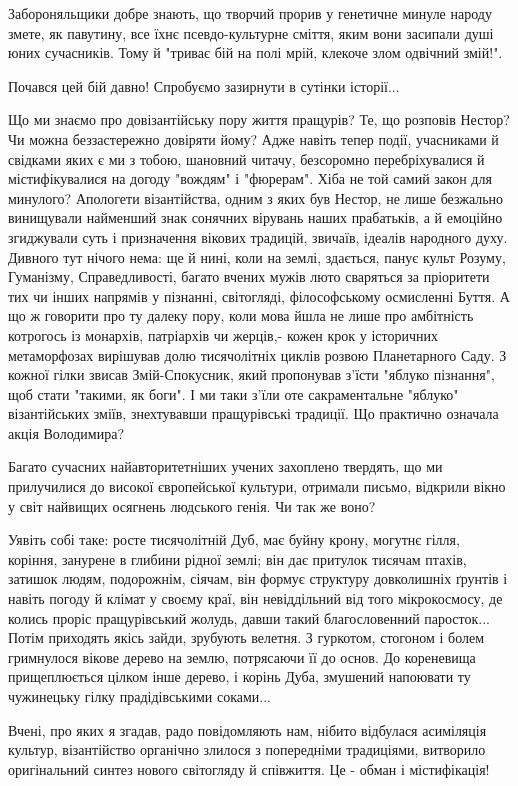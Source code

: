 Забороняльщики добре знають, що творчий прорив у генетичне минуле народу змете,
як павутину, все їхнє псевдо-культурне сміття, яким вони засипали душі юних
сучасників. Тому й "триває бій на полі мрій, клекоче злом одвічний змій!".

Почався цей бій давно! Спробуємо зазирнути в сутінки історії...

Що ми знаємо про довізантійську пору життя пращурів? Те, що розповів Нестор? Чи
можна беззастережно довіряти йому? Адже навіть тепер події, учасниками й
свідками яких є ми з тобою, шановний читачу, безсоромно перебріхувалися й
містифікувалися на догоду "вождям" і "фюрерам". Хіба не той самий закон для
минулого? Апологети візантійства, одним з яких був Нестор, не лише безжально
винищували найменший знак сонячних вірувань наших прабатьків, а й емоційно
згиджували суть і призначення вікових традицій, звичаїв, ідеалів народного
духу. Дивного тут нічого нема: ще й нині, коли на землі, здається, панує культ
Розуму, Гуманізму, Справедливості, багато вчених мужів люто сваряться за
пріоритети тих чи інших напрямів у пізнанні, світогляді, філософському
осмисленні Буття. А що ж говорити про ту далеку пору, коли мова йшла не лише
про амбітність котрогось із монархів, патріархів чи жерців,- кожен крок у
історичних метаморфозах вирішував долю тисячолітніх циклів розвою Планетарного
Саду. З кожної гілки звисав Змій-Спокусник, який пропонував з'їсти "яблуко
пізнання", щоб стати "такими, як боги". І ми таки з'їли оте сакраментальне
"яблуко" візантійських зміїв, знехтувавши пращурівські традиції. Що практично
означала акція Володимира?

Багато сучасних найавторитетніших учених захоплено твердять, що ми прилучилися
до високої європейської культури, отримали письмо, відкрили вікно у світ
найвищих осягнень людського генія. Чи так же воно?

Уявіть собі таке: росте тисячолітній Дуб, має буйну крону, могутнє гілля,
коріння, занурене в глибини рідної землі; він дає притулок тисячам птахів,
затишок людям, подорожнім, сіячам, він формує структуру довколишніх ґрунтів і
навіть погоду й клімат у своєму краї, він невіддільний від того мікрокосмосу,
де колись проріс пращурівський жолудь, давши такий благословенний паросток...
Потім приходять якісь зайди, зрубують велетня. З гуркотом, стогоном і болем
гримнулося вікове дерево на землю, потрясаючи її до основ. До кореневища
прищеплюється цілком інше дерево, і корінь Дуба, змушений напоювати ту
чужинецьку гілку прадідівськими соками...

Вчені, про яких я згадав, радо повідомляють нам, нібито відбулася асиміляція культур, візантійство органічно злилося з попередніми традиціями, витворило оригінальний синтез нового світогляду й співжиття. Це - обман і містифікація!

